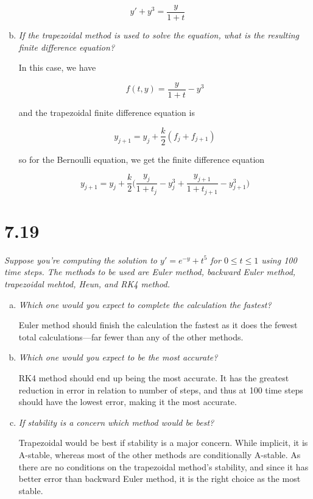 \documentclass{article}
\begin{document}
$$y' + y^3 = \frac{y}{1+t}$$

\begin{enumerate}[(a)]\setcounter{enumi}{1}
  \item \textit{If the trapezoidal method is used to solve the equation, what is the resulting finite difference equation?}

    In this case, we have

    $$f(t, y) = \frac{y}{1+t} - y^3$$

    and the trapezoidal finite difference equation is

    $$y_{j+1} = y_j + \frac{k}{2}(f_j + f_{j+1})$$

    so for the Bernoulli equation, we get the finite difference equation

    $$y_{j+1} = y_j + \frac{k}{2}\Big(\frac{y_j}{1+t_j} - y_j^3 + \frac{y_{j+1}}{1 + t_{j+1}} - y_{j+1}^3\Big)$$
\end{enumerate}






\section*{7.19  \normalsize}

\textit{Suppose you're computing the solution to $y' = e^{-y} + t^5$ for $0 \leq t \leq 1$ using 100 time steps. The methods to be used are Euler method, backward Euler method, trapezoidal mehtod, Heun, and RK4 method.}

\begin{enumerate}[(a)]
  \item \textit{Which one would you expect to complete the calculation the fastest?}

    Euler method should finish the calculation the fastest as it does the fewest total calculations---far fewer than any of the other methods.
  \item \textit{Which one would you expect to be the most accurate?}

    RK4 method should end up being the most accurate. It has the greatest reduction in error in relation to number of steps, and thus at 100 time steps should have the lowest error, making it the most accurate.
  \item \textit{If stability is a concern which method would be best?}

    Trapezoidal would be best if stability is a major concern. While implicit, it is A-stable, whereas most of the other methods are conditionally A-stable. As there are no conditions on the trapezoidal method's stability, and since it has better error than backward Euler method, it is the right choice as the most stable.
\end{enumerate}
\end{document}
